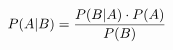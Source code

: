 \documentclass[preview]{standalone}
\begin{document}
\begin{align*}
\special{dvisvgm:raw <g id='unique000'>}P(A|B) = \frac{P(B|A) \cdot P(A)}{P(B)}\special{dvisvgm:raw </g>}
\end{align*}
\end{document}
